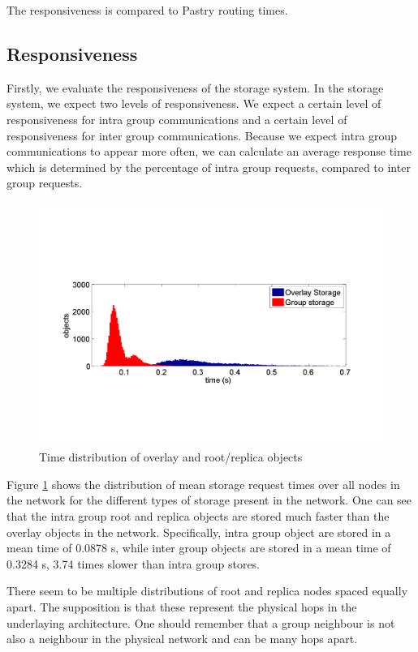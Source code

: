\documentclass[10pt,a4paper,conference]{IEEEtran}
\begin{document}
The responsiveness is compared to Pastry routing times.

\subsection{Responsiveness}

Firstly, we evaluate the responsiveness of the storage system. In the storage system, we expect two levels of responsiveness. We expect a certain
level of responsiveness for intra group communications and a certain level of responsiveness for inter group communications. Because we expect intra
group communications to appear more often, we can calculate an average response time which is determined by the percentage of intra group requests,
compared to inter group requests.

\begin{figure}[htbp]
 \centering
 \includegraphics[clip=true, viewport=1.5cm 1.3cm 25.5cm 19.7cm, width=\columnwidth]{request_time_distribution}
 \caption{Time distribution of overlay and root/replica objects}
 \label{fig_pithos_response}
\end{figure}
%
Figure \ref{fig_pithos_response} shows the distribution of mean storage request times over all nodes in the network for the different types of
storage present in the network. One can see that the intra group root and replica objects are stored much faster than the overlay objects in the
network. Specifically, intra group object are stored in a mean time of 0.0878 s, while inter group objects are stored in a mean time of 0.3284 s,
3.74 times slower than intra group stores.

There seem to be multiple distributions of root and replica nodes spaced equally apart. The supposition is that these represent the physical hops in
the underlaying architecture. One should remember that a group neighbour is not also a neighbour in the physical network and can be many hops apart.
\end{document}
